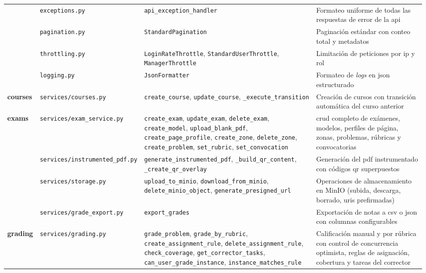 \begin{longtable}{p{1.8cm} p{3.2cm} p{4.5cm} p{4.5cm}}
& \texttt{exceptions.py}
& \texttt{api\_exception\_handler}
& Formateo uniforme de todas las respuestas de error de la \acs{api} \\

& \texttt{pagination.py}
& \texttt{StandardPagination}
& Paginación estándar con conteo total y metadatos \\

& \texttt{throttling.py}
& \texttt{LoginRateThrottle}, \texttt{StandardUserThrottle}, \texttt{ManagerThrottle}
& Limitación de peticiones por \acs{ip} y rol \\

& \texttt{logging.py}
& \texttt{JsonFormatter}
& Formateo de \textit{logs} en \acs{json} estructurado \\

\textbf{courses}
& \texttt{services/courses.py}
& \texttt{create\_course}, \texttt{update\_course}, \texttt{\_execute\_transition}
& Creación de cursos con transición automática del curso anterior \\

\textbf{exams}
& \texttt{services/exam\_service.py}
& \texttt{create\_exam}, \texttt{update\_exam}, \texttt{delete\_exam}, \texttt{create\_model}, \texttt{upload\_blank\_pdf}, \texttt{create\_page\_profile}, \texttt{create\_zone}, \texttt{delete\_zone}, \texttt{create\_problem}, \texttt{set\_rubric}, \texttt{set\_convocation}
& \acs{crud} completo de exámenes, modelos, perfiles de página, zonas, problemas, rúbricas y convocatorias \\

& \texttt{services/instrumented\_pdf.py}
& \texttt{generate\_instrumented\_pdf}, \texttt{\_build\_qr\_content}, \texttt{\_create\_qr\_overlay}
& Generación del \acs{pdf} instrumentado con códigos \acs{qr} superpuestos \\

& \texttt{services/storage.py}
& \texttt{upload\_to\_minio}, \texttt{download\_from\_minio}, \texttt{delete\_minio\_object}, \texttt{generate\_presigned\_url}
& Operaciones de almacenamiento en MinIO (subida, descarga, borrado, \acsp{uri} prefirmadas) \\

& \texttt{services/grade\_export.py}
& \texttt{export\_grades}
& Exportación de notas a \acs{csv} o \acs{json} con columnas configurables \\

\textbf{grading}
& \texttt{services/grading.py}
& \texttt{grade\_problem}, \texttt{grade\_by\_rubric}, \texttt{create\_assignment\_rule}, \texttt{delete\_assignment\_rule}, \texttt{check\_coverage}, \texttt{get\_corrector\_tasks}, \texttt{can\_user\_grade\_instance}, \texttt{instance\_matches\_rule}
& Calificación manual y por rúbrica con control de concurrencia optimista, reglas de asignación, cobertura y tareas del corrector \\


\end{longtable}
